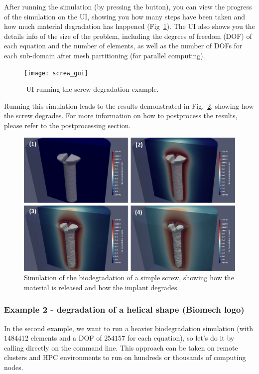 After running the simulation (by pressing the  button), you can view the progress of the simulation on the UI, showing you how many steps have been taken and how much material degradation has happened (Fig~\ref{fig:screw_gui}). The UI also shows you the details info of the size of the problem, including the degrees of freedom (DOF) of each equation and the number of elements, as well as the number of DOFs for each sub-domain after mesh partitioning (for parallel computing).

\begin{figure}[h]
\center \texttt{[image: screw\_gui]}
\caption{\biodeg{}-UI running the screw degradation example.} \label{fig:screw_gui}
\end{figure}

Running this simulation leads to the results demonstrated in Fig.~\ref{fig:screw_degradation}, showing how the screw degrades. For more information on how to postprocess the results, please refer to the postprocessing section.

\begin{figure}[h]
\center \includegraphics[width=15cm]{screw_degradation}
\caption{Simulation of the biodegradation of a simple screw, showing how the material is released and how the implant degrades.} \label{fig:screw_degradation}
\end{figure}


\subsubsection{Example 2 - degradation of a helical shape (Biomech logo)}\label{sec:example2}

In the second example, we want to run a heavier biodegradation simulation (with $\num{1484412}$ elements and a DOF of $\num{254157}$ for each equation), so let's do it by calling \biodeg{} directly on the command line. This approach can be taken on remote clusters and HPC environments to run \biodeg{} on hundreds or thousands of computing nodes.

